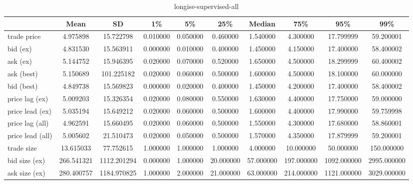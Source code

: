 \begin{table}[ht]
    \centering
    \caption[shortise-supervised-all]{longise-supervised-all}
    \label{tab:ise-supervised-all}
    \begin{tabular}{@{}lSSSSSSSSS@{}}
        \toprule
        {}               & {Mean}     & {SD}        & {1\%}    & {5\%}    & {25\%}    & {Median}  & {75\%}     & {95\%}      & {99\%}      \\
        \midrule
        trade price      & 4.975898   & 15.722798   & 0.010000 & 0.050000 & 0.460000  & 1.540000  & 4.300000   & 17.799999   & 59.200001   \\
        bid (ex)         & 4.831530   & 15.563911   & 0.000000 & 0.010000 & 0.400000  & 1.450000  & 4.150000   & 17.400000   & 58.400002   \\
        ask (ex)         & 5.144752   & 15.946395   & 0.020000 & 0.070000 & 0.520000  & 1.650000  & 4.500000   & 18.299999   & 60.400002   \\
        ask (best)       & 5.150689   & 101.225182  & 0.020000 & 0.060000 & 0.500000  & 1.600000  & 4.500000   & 18.100000   & 60.000000   \\
        bid (best)       & 4.849738   & 15.569823   & 0.000000 & 0.020000 & 0.400000  & 1.450000  & 4.200000   & 17.400000   & 58.400002   \\
        price lag (ex)   & 5.009203   & 15.326354   & 0.020000 & 0.080000 & 0.550000  & 1.630000  & 4.400000   & 17.750000   & 59.000000   \\
        price lead (ex)  & 5.035194   & 15.649212   & 0.020000 & 0.060000 & 0.500000  & 1.600000  & 4.400000   & 17.990000   & 59.759998   \\
        price lag (all)  & 4.962591   & 15.660495   & 0.020000 & 0.060000 & 0.500000  & 1.550000  & 4.300000   & 17.680000   & 58.860001   \\
        price lead (all) & 5.005602   & 21.510473   & 0.020000 & 0.050000 & 0.500000  & 1.570000  & 4.350000   & 17.879999   & 59.200001   \\
        trade size       & 13.615033  & 77.752615   & 1.000000 & 1.000000 & 1.000000  & 4.000000  & 10.000000  & 50.000000   & 150.000000  \\
        bid size (ex)    & 266.541321 & 1112.201294 & 0.000000 & 1.000000 & 20.000000 & 57.000000 & 197.000000 & 1092.000000 & 2995.000000 \\
        ask size (ex)    & 280.400757 & 1184.970825 & 1.000000 & 2.000000 & 21.000000 & 63.000000 & 214.000000 & 1121.000000 & 3029.000000 \\

\end{tabular}
\end{table}
